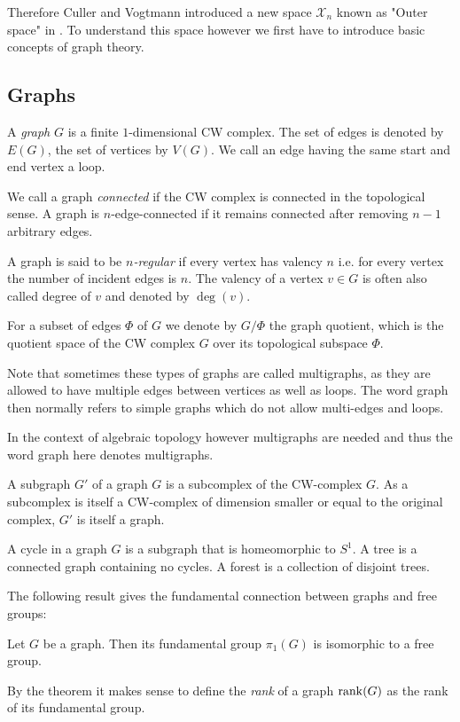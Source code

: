 Therefore Culler and Vogtmann introduced a new space $\mathcal{X}_{n}$ known as "Outer space" in \cite{vogtmann86}.
To understand this space however we first have to introduce basic concepts of graph theory.

\subsection{Graphs}
\begin{definition}
	A \emph{graph} $G$ is a finite $1$-dimensional CW complex. The set of edges is denoted by $E(G)$, the set of vertices by  $V(G)$.
	We call an edge having the same start and end vertex a loop.

	We call a graph \emph{connected} if the CW complex is connected in the topological sense.
	A graph is $n$-edge-connected if it remains connected after removing  $n-1$ arbitrary edges.

	A graph is said to be \emph{$n$-regular} if every vertex has valency $n$ i.e. for every vertex the number of incident edges is $n$.
	The valency of a vertex $v \in G$ is often also called degree of $v$ and denoted by $\deg(v)$.

	For a subset of edges $\Phi$ of $G$ we denote by $G / \Phi$ the graph quotient, which is the quotient space of the CW complex $G$ over its topological subspace $\Phi$.
\end{definition}

\begin{remark}
	Note that sometimes these types of graphs are called multigraphs, as they are allowed to have multiple edges between vertices as well as loops.
	The word graph then normally refers to simple graphs which do not allow multi-edges and loops.

	In the context of algebraic topology however multigraphs are needed and thus the word graph here denotes multigraphs.
\end{remark}

\begin{definition}
	A subgraph $G'$ of a graph $G$ is a subcomplex of the CW-complex $G$. As a subcomplex is itself a CW-complex of dimension smaller or equal to the original complex,
	 $G'$ is itself a graph.

	A cycle in a graph $G$ is a subgraph that is homeomorphic to $S^1$. A tree is a
	connected graph containing no cycles. A forest is a collection of disjoint trees.
\end{definition}

The following result gives the fundamental connection between graphs and free groups:
\begin{theorem}\label{thm:fg_graph}
	Let $G$ be a graph. Then its fundamental group $\pi_{1}(G)$ is isomorphic to a free group.
\end{theorem}
By the theorem it makes sense to define the \emph{rank} of a graph $\rank(G)$ as the rank of its fundamental group.

